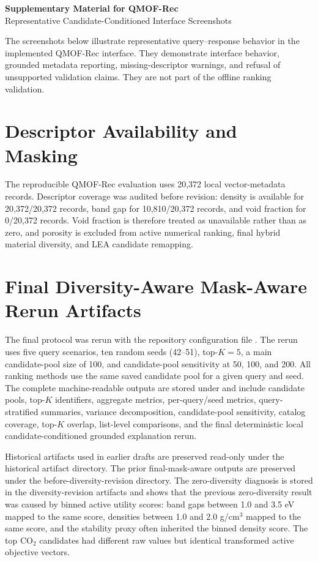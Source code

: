 \documentclass[12pt,a4paper]{article}
\begin{document}
\begin{center}
{\Large\bfseries Supplementary Material for QMOF-Rec}\\[0.5em]
{\normalsize Representative Candidate-Conditioned Interface Screenshots}
\end{center}

The screenshots below illustrate representative query--response behavior in the implemented QMOF-Rec interface. They demonstrate interface behavior, grounded metadata reporting, missing-descriptor warnings, and refusal of unsupported validation claims. They are not part of the offline ranking validation.

\section*{Descriptor Availability and Masking}

The reproducible QMOF-Rec evaluation uses 20{,}372 local vector-metadata records. Descriptor coverage was audited before revision: density is available for 20{,}372/20{,}372 records, band gap for 10{,}810/20{,}372 records, and void fraction for 0/20{,}372 records. Void fraction is therefore treated as unavailable rather than as zero, and porosity is excluded from active numerical ranking, final hybrid material diversity, and LEA candidate remapping.

\section*{Final Diversity-Aware Mask-Aware Rerun Artifacts}

The final protocol was rerun with the repository configuration file
. The rerun uses five query scenarios, ten random seeds (42--51), top-$K=5$, a main candidate-pool size of 100, and candidate-pool sensitivity at 50, 100, and 200. All ranking methods use the same saved candidate pool for a given query and seed. The complete machine-readable outputs are stored under  and include candidate pools, top-$K$ identifiers, aggregate metrics, per-query/seed metrics, query-stratified summaries, variance decomposition, candidate-pool sensitivity, catalog coverage, top-$K$ overlap, list-level comparisons, and the final deterministic local candidate-conditioned grounded explanation rerun.

Historical artifacts used in earlier drafts are preserved read-only under the historical artifact directory. The prior final-mask-aware outputs are preserved under the before-diversity-revision directory. The zero-diversity diagnosis is stored in the diversity-revision artifacts and shows that the previous zero-diversity result was caused by binned active utility scores: band gaps between 1.0 and 3.5 eV mapped to the same score, densities between 1.0 and 2.0 g/cm$^3$ mapped to the same score, and the stability proxy often inherited the binned density score. The top CO$_2$ candidates had different raw values but identical transformed active objective vectors.
\end{document}
